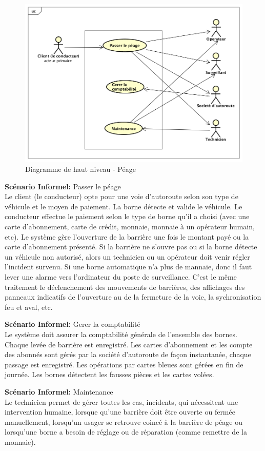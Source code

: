 \begin{figure}[h]
    \centering
    \includegraphics[scale=0.50]{02_Desenvolvimento/TD2/images/hautNiveau.png}
    \caption{Diagramme de haut niveau - Péage}
    \label{fig:hautNiveau}
\end{figure}

\textbf{Scénario Informel:} Passer le péage\\
Le client (le conducteur) opte pour une voie d’autoroute selon son type de véhicule et le moyen de paiement. La borne détecte et valide le véhicule. Le conducteur effectue le paiement selon le type de borne qu’il a choisi (avec une carte d’abonnement, carte de crédit, monnaie, monnaie à un opérateur humain, etc). Le système gère l’ouverture de la barrière une fois le montant payé ou la carte d’abonnement présenté. Si la barrière ne s’ouvre pas ou si la borne détecte un véhicule non autorisé, alors un technicien ou un opérateur doit venir régler l’incident survenu. Si une borne automatique n'a plus de mannaie, donc il faut lever une alarme vers l'ordinateur du poste de surveillance. C'est le même traitement le déclenchement des mouvements de barrières, des affichages des panneaux indicatifs de l'ouverture au de la fermeture de la voie, la sychronisation feu et aval, etc.

\textbf{Scénario Informel:} Gerer la comptabilité \\
Le système doit assurer la comptabilité générale de l’ensemble des bornes. Chaque levée de barrière est enregistré. Les cartes d’abonnement et les compte des abonnés sont gérés par la société d’autoroute de façon instantanée, chaque passage est enregistré. Les opérations par cartes bleues sont gérées en fin de journée. Les bornes détectent les fausses pièces et les cartes volées.

\textbf{Scénario Informel:} Maintenance  \\
Le technicien permet de gérer toutes les cas, incidents, qui nécessitent une intervention humaine, lorsque qu’une barrière doit être ouverte ou fermée manuellement, lorsqu’un usager se retrouve coincé à la barrière de péage ou lorsqu’une borne a besoin de réglage ou de réparation (comme remettre de la monnaie).